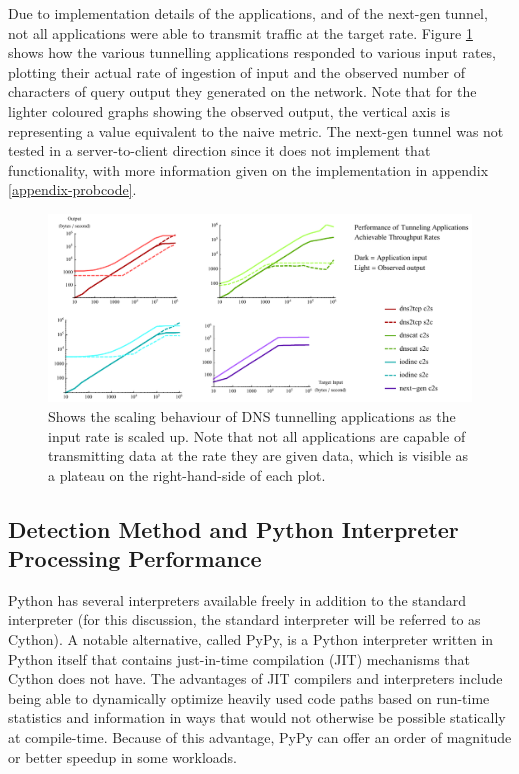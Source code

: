 \documentclass[12pt]{report}
\theoremstyle{remark}
\theoremstyle{definition}
\theoremstyle{definition}
\theoremstyle{definition}
\begin{document}
Due to implementation details of the applications, and of the next-gen tunnel,
not all applications were able to transmit traffic at the target rate. Figure
\ref{tunrates} shows how the various tunnelling applications responded to
various input rates, plotting their actual rate of ingestion of input and the
observed number of characters of query output they generated on the network.
Note that for the lighter coloured graphs showing the observed output, the
vertical axis is representing a value equivalent to the naive metric. The
next-gen tunnel was not tested in a server-to-client direction since it does not
implement that functionality, with more information given on the implementation
in appendix \ref{appendix-probcode}.

\begin{figure}
\centering
\includegraphics[width=\textwidth]{figures/tunrates.pdf}
\caption[DNS Tunneling Application Throughput Scaling]{Shows the scaling
behaviour of DNS tunnelling applications as the input rate is scaled up. Note
that not all applications are capable of transmitting data at the rate they are
given data, which is visible as a plateau on the right-hand-side of each plot.}
\label{tunrates}
\end{figure}

\subsection{Detection Method and Python Interpreter Processing Performance}
\label{processing-perf}
Python has several interpreters available freely in addition to the standard
interpreter (for this discussion, the standard interpreter will be referred to
as Cython). A notable alternative, called PyPy, is a Python interpreter written
in Python itself that contains just-in-time compilation (JIT) mechanisms that
Cython does not have. The advantages of JIT compilers and interpreters include
being able to dynamically optimize heavily used code paths based on run-time
statistics and information in ways that would not otherwise be possible statically
at compile-time. Because of this advantage, PyPy can offer an order of magnitude
or better speedup\cite{pypyvc-strfmt} in some workloads.
\end{document}
